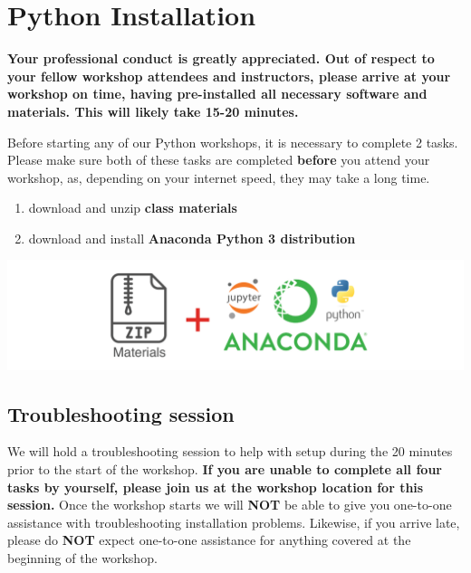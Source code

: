 \documentclass[
]{book}
\providecommand{\tightlist}{%
  \setlength{\itemsep}{0pt}\setlength{\parskip}{0pt}}
\begin{document}
\hypertarget{python-installation}{%
\chapter{Python Installation}\label{python-installation}}

\begin{alert}

\textbf{Your professional conduct is greatly appreciated. Out of respect to your fellow workshop attendees and instructors, please arrive at your workshop on time, having pre-installed all necessary software and materials. This will likely take 15-20 minutes.}

\end{alert}

Before starting any of our Python workshops, it is necessary to complete 2 tasks. Please make sure both of these tasks are completed \textbf{before} you attend your workshop, as, depending on your internet speed, they may take a long time.

\begin{enumerate}
\def\labelenumi{\arabic{enumi}.}
\tightlist
\item
  download and unzip \textbf{class materials}
\item
  download and install \textbf{Anaconda Python 3 distribution}
\end{enumerate}

\includegraphics{Python/PythonInstall/images/install_software_Python.png}

\hypertarget{troubleshooting-session-1}{%
\section{Troubleshooting session}\label{troubleshooting-session-1}}

We will hold a troubleshooting session to help with setup during the 20 minutes prior to the start of the workshop.
\textbf{If you are unable to complete all four tasks by yourself, please join us at the workshop location for this session.}
Once the workshop starts we will \textbf{NOT} be able to give you one-to-one assistance with troubleshooting installation problems. Likewise, if you arrive late, please do \textbf{NOT} expect one-to-one assistance for anything covered at the beginning of the workshop.
\end{document}
